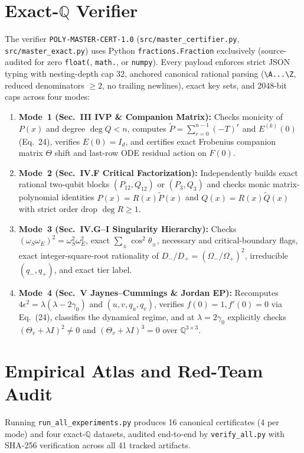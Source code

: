 \documentclass[10pt,twocolumn]{article}
\newcommand{\QQ}{\mathbb{Q}}
\begin{document}
\section{Exact-\texorpdfstring{$\QQ$}{Q} Verifier}\label{sec:cert}
The verifier \texttt{POLY-MASTER-CERT-1.0} (\texttt{src/master\_certifier.py}, \texttt{src/master\_exact.py}) uses Python \texttt{fractions.Fraction} exclusively (source-audited for zero \texttt{float(}, \texttt{math.}, or \texttt{numpy}). Every payload enforces strict JSON typing with nesting-depth cap $32$, anchored canonical rational parsing (\texttt{\textbackslash A...\textbackslash Z}, reduced denominators $\ge 2$, no trailing newlines), exact key sets, and 2048-bit caps across four modes:
\begin{enumerate}[leftmargin=*,nosep]
  \item \textbf{Mode~1 (Sec.~III IVP \& Companion Matrix):} Checks monicity of $P(x)$ and degree $\deg Q < n$, computes $\tilde{P} = \sum_{r=0}^{n-1}(-T)^r$ and $E^{(k)}(0)$ (Eq.~24), verifies $E(0) = I_d$, and certifies exact Frobenius companion matrix $\Theta$ shift and last-row ODE residual action on $F(0)$.
  \item \textbf{Mode~2 (Sec.~IV.F Critical Factorization):} Independently builds exact rational two-qubit blocks $(P_{12}, Q_{12})$ or $(P_3, Q_3)$ and checks monic matrix-polynomial identities $P(x) = R(x)\tilde{P}(x)$ and $Q(x) = R(x)\tilde{Q}(x)$ with strict order drop $\deg R \ge 1$.
  \item \textbf{Mode~3 (Sec.~IV.G--I Singularity Hierarchy):} Checks $(\omega_S\omega_E)^2 = \omega_S^2 \omega_E^2$, exact $\sum_\pm \cos^2\theta_\pm$, necessary and critical-boundary flags, exact integer-square-root rationality of $D_-/D_+ = (\Omega_-/\Omega_+)^2$, irreducible $(q_-, q_+)$, and exact tier label.
  \item \textbf{Mode~4 (Sec.~V Jaynes--Cummings \& Jordan EP):} Recomputes $4\epsilon^2 = \lambda(\lambda - 2\gamma_0)$ and $(u, v, q_u, q_v)$, verifies $f(0) = 1, f'(0) = 0$ via Eq.~(24), classifies the dynamical regime, and at $\lambda = 2\gamma_0$ explicitly checks $(\Theta_v + \lambda I)^2 \neq 0$ and $(\Theta_v + \lambda I)^3 = 0$ over $\QQ^{3\times 3}$.
\end{enumerate}

\section{Empirical Atlas and Red-Team Audit}\label{sec:results}
Running \texttt{run\_all\_experiments.py} produces 16 canonical certificates (4 per mode) and four exact-$\QQ$ datasets, audited end-to-end by \texttt{verify\_all.py} with SHA-256 verification across all 41 tracked artifacts.
\end{document}
